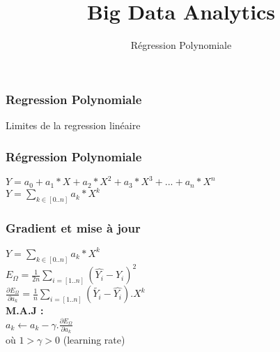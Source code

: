 \documentclass{formation}
\title{Big Data Analytics}
\subtitle{Régression Polynomiale}
\begin{document}
\maketitle


\begin{frame}
  \frametitle{Regression Polynomiale}
  Limites de la regression linéaire
\end{frame}

\begin{frame}
  \frametitle{Régression Polynomiale}
  $Y=a_0+a_1*X+a_2*X^2+a_3*X^3+...+a_n*X^n$ \\
  \newline
  $Y=\underset{k \in [0..n]}{\sum}{a_k*X^k}$
\end{frame}

\begin{frame}
  \frametitle{Gradient et mise à jour}
  $Y=\underset{k \in [0..n]}{\sum}{a_k*X^k}$ \\
  $\;$ \\
  $E_{\Omega} = \frac{1}{2n}\underset{i=[1..n]}{\sum}( \hat{Y_i} - Y_i )^2$ \\
  $\;$ \\
  $\frac{\partial{E_{\Omega}}}{\partial{a_k}} = \frac{1}{n}\underset{i=[1..n]}{\sum}(\tilde{Y_i} - \hat{Y_i}).X^k$ \\
  $\;$ \\
  $\;$ \\
  \textbf{M.A.J :} \\
  $\;$ \\
  $a_k \leftarrow a_k - \gamma.\frac{\partial{E_{\Omega}}}{\partial{a_k}}$ \\
  $\;$ \\
  où $1 > \gamma > 0$ (learning rate)
\end{frame}
\end{document}
